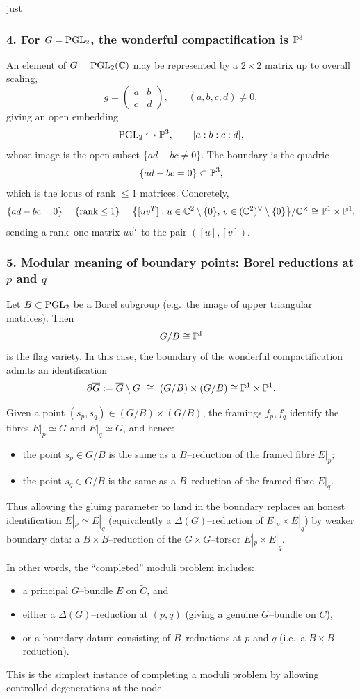 just \documentclass[12pt]{article}
\begin{document}
\subsubsection*{4. For $G=\PGL_2$, the wonderful compactification is $\P^3$}

An element of $G=\PGL_2(\C)$ may be represented by a $2\times 2$ matrix up to
overall scaling,
\[
g=\begin{pmatrix}a&b\\c&d\end{pmatrix},
\qquad (a,b,c,d)\neq 0,
\]
giving an open embedding
\[
\PGL_2 \hookrightarrow \P^3,\qquad [a:b:c:d],
\]
whose image is the open subset $\{ad-bc\neq 0\}$.  The boundary is the quadric
\[
\{ad-bc=0\}\subset \P^3,
\]
which is the locus of rank $\le 1$ matrices.  Concretely,
\[
\{ad-bc=0\}
=
\{\text{rank}\le 1\}
=
\bigl\{[u v^T]: u\in \C^2\setminus\{0\},\, v\in(\C^2)^\vee\setminus\{0\}\bigr\}/\C^\times
\cong \P^1\times \P^1,
\]
sending a rank--one matrix $uv^T$ to the pair $([u],[v])$.

\subsubsection*{5. Modular meaning of boundary points: Borel reductions at $p$ and $q$}

Let $B\subset \PGL_2$ be a Borel subgroup (e.g.\ the image of upper triangular
matrices).  Then
\[
G/B \cong \P^1
\]
is the flag variety.  In this case, the boundary of the wonderful
compactification admits an identification
\[
\partial\overline G:=\overline G\setminus G \ \cong\ (G/B)\times (G/B)
\cong \P^1\times \P^1.
\]

Given a point $(s_p,s_q)\in (G/B)\times (G/B)$, the framings $f_p,f_q$ identify
the fibres $E|_p\simeq G$ and $E|_q\simeq G$, and hence:
\begin{itemize}
\item the point $s_p\in G/B$ is the same as a $B$--reduction of the framed fibre $E|_p$;
\item the point $s_q\in G/B$ is the same as a $B$--reduction of the framed fibre $E|_q$.
\end{itemize}
Thus allowing the gluing parameter to land in the boundary replaces an honest
identification $E|_p\simeq E|_q$ (equivalently a $\Delta(G)$--reduction of
$E|_p\times E|_q$) by weaker boundary data: a $B\times B$--reduction of the
$G\times G$--torsor $E|_p\times E|_q$.

In other words, the ``completed'' moduli problem includes:
\begin{itemize}
\item a principal $G$--bundle $E$ on $\widetilde C$, and
\item either a $\Delta(G)$--reduction at $(p,q)$ (giving a genuine $G$--bundle on $C$),
\item or a boundary datum consisting of $B$--reductions at $p$ and $q$
(i.e.\ a $B\times B$--reduction).
\end{itemize}
This is the simplest instance of completing a moduli problem by allowing
controlled degenerations at the node.
\end{document}
